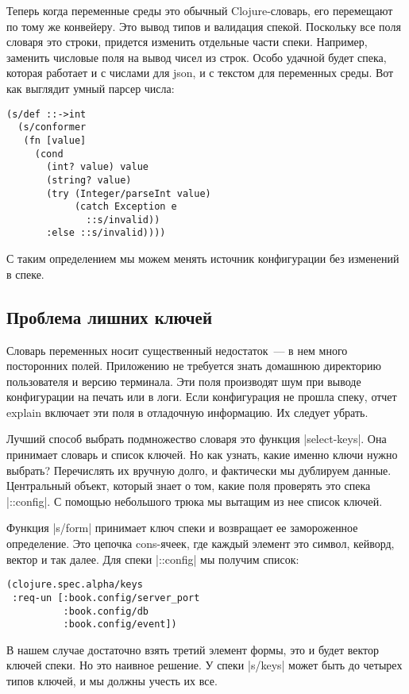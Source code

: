 Теперь когда переменные среды это обычный Clojure-словарь, его перемещают по
тому же конвейеру. Это вывод типов и валидация спекой. Поскольку все поля
словаря это строки, придется изменить отдельные части спеки. Например, заменить
числовые поля на вывод чисел из строк. Особо удачной будет спека, которая
работает и с числами для json, и с текстом для переменных среды. Вот как
выглядит умный парсер числа:

\begin{verbatim}
(s/def ::->int
  (s/conformer
   (fn [value]
     (cond
       (int? value) value
       (string? value)
       (try (Integer/parseInt value)
            (catch Exception e
              ::s/invalid))
       :else ::s/invalid))))
\end{verbatim}

С таким определением мы можем менять источник конфигурации без изменений в
спеке.

\subsection{Проблема лишних ключей}

Словарь переменных носит существенный недостаток~--- в нем много посторонних
полей. Приложению не требуется знать домашнюю директорию пользователя и версию
терминала. Эти поля производят шум при выводе конфигурации на печать или в
логи. Если конфигурация не прошла спеку, отчет explain включает эти поля в
отладочную информацию. Их следует убрать.

Лучший способ выбрать подмножество словаря это функция \spverb|select-keys|. Она
принимает словарь и список ключей. Но как узнать, какие именно ключи нужно
выбрать? Перечислять их вручную долго, и фактически мы дублируем
данные. Центральный объект, который знает о том, какие поля проверять это спека
\spverb|::config|. С помощью небольшого трюка мы вытащим из нее список ключей.

Функция \spverb|s/form| принимает ключ спеки и возвращает ее замороженное
определение. Это цепочка cons-ячеек, где каждый элемент это символ, кейворд,
вектор и так далее. Для спеки \spverb|::config| мы получим список:

\begin{verbatim}
(clojure.spec.alpha/keys
 :req-un [:book.config/server_port
          :book.config/db
          :book.config/event])
\end{verbatim}

В нашем случае достаточно взять третий элемент формы, это и будет вектор ключей
спеки. Но это наивное решение. У спеки \spverb|s/keys| может быть до четырех типов
ключей, и мы должны учесть их все.

